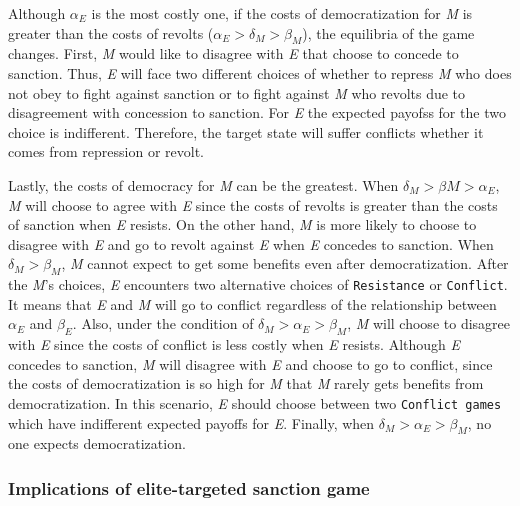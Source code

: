 \documentclass[11pt]{article}
\begin{document}
Although $\alpha_{E}$ is the most costly one, if the costs of democratization for \textit{M} is greater than the costs of revolts ($\alpha_{E} > \delta_{M} > \beta_{M}$), the equilibria of the game changes. First, \textit{M} would like to disagree with \textit{E} that choose to concede to sanction. Thus, \textit{E} will face two different choices of whether to repress \textit{M} who does not obey to fight against sanction or to fight against \textit{M} who revolts due to disagreement with concession to sanction. For \textit{E} the expected payofss for the two choice is indifferent. Therefore, the target state will suffer conflicts whether it comes from repression or revolt.

Lastly, the costs of democracy for \textit{M} can be the greatest. When $\delta_{M} > \beta{M} > \alpha_{E}$, \textit{M} will choose to agree with \textit{E} since the costs of revolts is greater than the costs of sanction when \textit{E} resists. On the other hand, \textit{M} is more likely to choose to disagree with \textit{E} and go to revolt against \textit{E} when \textit{E} concedes to sanction. When $\delta_{M} > \beta_{M}$, \textit{M} cannot expect to get some benefits even after democratization. After the \textit{M}'s choices, \textit{E} encounters two alternative choices of \texttt{Resistance} or \texttt{Conflict}. It means that \textit{E} and \textit{M} will go to conflict regardless of the relationship between $\alpha_{E}$ and $\beta_{E}$. Also, under the condition of $\delta_{M} > \alpha_{E} > \beta_{M}$, \textit{M} will choose to disagree with \textit{E} since the costs of conflict is less costly when \textit{E} resists. Although \textit{E} concedes to sanction, \textit{M} will disagree with \textit{E} and choose to go to conflict, since the costs of democratization is so high for \textit{M} that \textit{M} rarely gets benefits from democratization. In this scenario, \textit{E} should choose between two \texttt{Conflict games} which have indifferent expected payoffs for \textit{E}. Finally, when $\delta_{M} > \alpha_{E} > \beta_{M}$, no one expects democratization.

	
\subsubsection*{Implications of elite-targeted sanction game}
\end{document}
